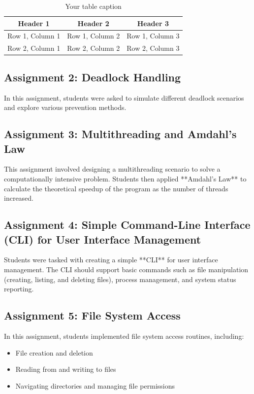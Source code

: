 \documentclass[12pt]{article}
\begin{document}
\begin{table}[htbp] %
    \centering
    \begin{tabular}{|c|c|c|} %
    \hline
    Header 1 & Header 2 & Header 3 \\ %
    \hline
    Row 1, Column 1 & Row 1, Column 2 & Row 1, Column 3 \\ %
    \hline
    Row 2, Column 1 & Row 2, Column 2 & Row 2, Column 3 \\ %
    \hline
    \end{tabular}
    \caption{Your table caption} %
    \label{tab:your_label} %
\end{table}

\subsection{Assignment 2: Deadlock Handling}
In this assignment, students were asked to simulate different deadlock scenarios and explore various prevention methods.

\subsection{Assignment 3: Multithreading and Amdahl's Law}
This assignment involved designing a multithreading scenario to solve a computationally intensive problem. Students then applied **Amdahl's Law** to calculate the theoretical speedup of the program as the number of threads increased.

\subsection{Assignment 4: Simple Command-Line Interface (CLI) for User Interface Management}
Students were tasked with creating a simple **CLI** for user interface management. The CLI should support basic commands such as file manipulation (creating, listing, and deleting files), process management, and system status reporting.

\subsection{Assignment 5: File System Access}
In this assignment, students implemented file system access routines, including:
\begin{itemize}
    \item File creation and deletion
    \item Reading from and writing to files
    \item Navigating directories and managing file permissions
\end{itemize}
\end{document}
